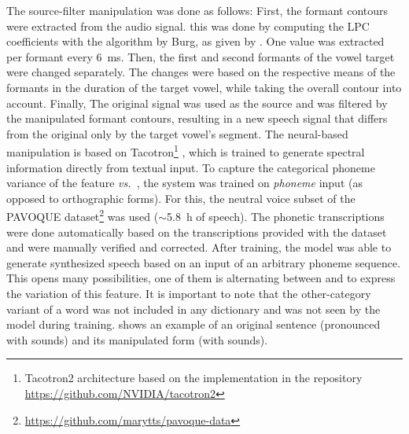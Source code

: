 The source-filter manipulation was done as follows:
First, the formant contours were extracted from the audio signal.
this was done by computing the LPC coefficients with the algorithm by Burg, as given by \citet{Press1989numerical}.
One value was extracted per formant every \SI{6}{\milli\second}.
Then, the first and second formants of the vowel target were changed separately.
The changes were based on the respective means of the formants in the duration of the target vowel, while taking the overall contour into account.
Finally, The original signal was used as the source and was filtered by the manipulated formant contours, resulting in a new speech signal that differs from the original only by the target vowel's segment.
The neural-based manipulation is based on Tacotron\footnote{Tacotron2 architecture based on the implementation in the repository \url{https://github.com/NVIDIA/tacotron2}} \citep{Shen2018natural}, which is trained to generate spectral information directly from textual input.
To capture the categorical phoneme variance of the feature \emph{\textipa{[\c{c}]} vs.\ \textipa{[k]}}, the system was trained on \emph{phoneme} input (as opposed to orthographic forms).
For this, the neutral voice subset of the PAVOQUE dataset\footnote{\url{https://github.com/marytts/pavoque-data}} \citep{Steiner2013pavoque} was used ($\sim$\SI{5.8}{\hour} of speech).
The phonetic transcriptions were done automatically based on the transcriptions provided with the dataset and were manually verified and corrected.
After training, the model was able to generate synthesized speech based on an input of an arbitrary phoneme sequence.
This opens many possibilities, one of them is alternating between \textipa{[\c{c}]} and \textipa{[k]} to express the variation of this feature.
It is important to note that the other-category variant of a word was not included in any dictionary and was not seen by the model during training.
 shows an example of an original sentence (pronounced with \textipa{[\c{c}]} sounds) and its manipulated form (with \textipa{[k]} sounds).
%
